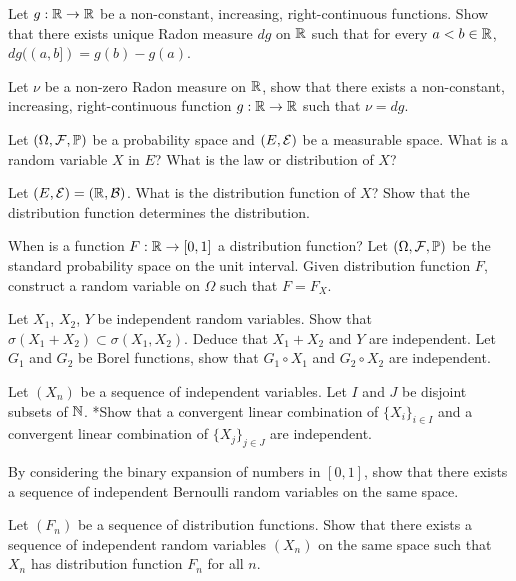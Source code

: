 \begin{question}{9}
Let $g : \mathbb{R}\rightarrow \mathbb{R}$ be a non-constant, increasing, right-continuous functions. Show that there exists unique Radon measure $dg$ on $\mathbb{R}$ such that for every $a<b\in \mathbb{R}$, $dg((a,b]) = g(b) - g(a)$.

Let $\nu$ be a non-zero Radon measure on $\mathbb{R}$, show that there exists a non-constant, increasing, right-continuous function $g:\mathbb{R}\rightarrow \mathbb{R}$ such that $\nu = dg$.
\end{question}

\begin{question}{8}
    Let $(\Omega,\mathcal{F},\mathbb{P})$ be a probability space and $(E,\mathcal{E})$ be a measurable space. What is a random variable $X$ in $E$? What is the law or distribution of $X$?
    
    Let $(E,\mathcal{E}) = (\mathbb{R},\mathcal{B})$. What is the distribution function of $X$? Show that the distribution function determines the distribution.
    
    When is a function $F : \mathbb{R} \rightarrow [0,1]$ a distribution function? Let $(\Omega,\mathcal{F},\mathbb{P})$ be the standard probability space on the unit interval. Given distribution function $F$, construct a random variable on $\Omega$ such that $F = F_X$.
\end{question}

\begin{question}{9}
    Let $X_1$, $X_2$, $Y$ be independent random variables. Show that $\sigma(X_1+X_2) \subset \sigma(X_1,X_2)$. Deduce that $X_1+X_2$ and $Y$ are independent. Let $G_1$ and $G_2$ be Borel functions, show that $G_1 \circ X_1$ and $G_2 \circ X_2$ are independent.

    Let $(X_n)$ be a sequence of independent variables. Let $I$ and $J$ be disjoint subsets of $\mathbb{N}$. *Show that a convergent linear combination of $\{X_i\}_{i\in I}$ and a convergent linear combination of $\{X_j\}_{j\in J}$ are independent.

     By considering the binary expansion of numbers in $[0,1]$, show that there exists a sequence of independent Bernoulli random variables on the same space.

    Let $(F_n)$ be a sequence of distribution functions. Show that there exists a sequence of independent random variables $(X_n)$ on the same space such that $X_n$ has distribution function $F_n$ for all $n$.
\end{question}

